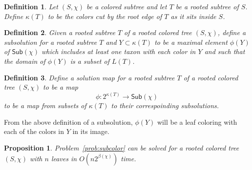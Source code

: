 \documentclass{amsart}
\newcommand{\col}{\chi}
\newcommand{\subcolS}{\mathsf{Sub}}
\newcommand{\cut}{\kappa}
\newcommand{\bad}{\beta}
\newtheorem{prop}{Proposition}
\newtheorem{defn}{Definition}
\begin{document}
\begin{defn}
  Let $(S, \col)$ be a colored subtree and let $T$ be a rooted subtree of $S$.
  Define $\cut(T)$ to be the colors cut by the root edge of $T$ as it sits inside $S$.
\end{defn}

\begin{defn}
  Given a rooted subtree $T$ of a rooted colored tree $(S, \col)$, define a subsolution for a rooted subtree $T$ and $Y \subset \cut(T)$ to be a maximal element $\phi(Y)$ of $\subcolS(\col)$ which includes at least one taxon with each color in $Y$ and such that the domain of $\phi(Y)$ is a subset of $L(T)$.
\end{defn}

\begin{defn}
  Define a solution map for a rooted subtree $T$ of a rooted colored tree $(S, \col)$ to be a map
  \[
  \phi: 2^{\cut(T)} \rightarrow \subcolS(\col)
  \]
  to be a map from subsets of $\cut(T)$ to their correspoinding subsolutions.
\end{defn}

From the above definition of a subsolution, $\phi(Y)$ will be a leaf coloring with each of the colors in $Y$ in its image.

\begin{prop}
Problem~\ref{prob:subcolor} can be solved for a rooted colored tree $(S, \col)$ with $n$ leaves in $O(n 2^{\bad(\col)})$ time.
\end{prop}
\end{document}
